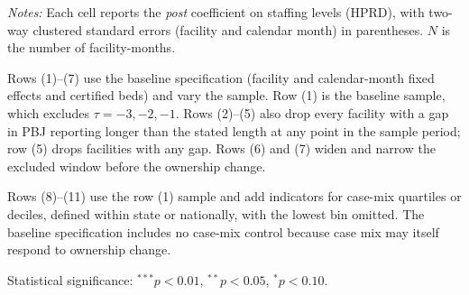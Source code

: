 \documentclass[11pt]{article}
\begin{document}
\begin{table}[!ht]
\begin{threeparttable}
\begin{tablenotes}[flushleft]
\footnotesize
\item \textit{Notes:} Each cell reports the \textit{post} coefficient on staffing levels (HPRD), with two-way clustered standard errors (facility and calendar month) in parentheses. $N$ is the number of facility-months.
\item Rows (1)--(7) use the baseline specification (facility and calendar-month fixed effects and certified beds) and vary the sample. Row (1) is the baseline sample, which excludes $\tau = -3, -2, -1$. Rows (2)--(5) also drop every facility with a gap in PBJ reporting longer than the stated length at any point in the sample period; row (5) drops facilities with any gap. Rows (6) and (7) widen and narrow the excluded window before the ownership change.
\item Rows (8)--(11) use the row (1) sample and add indicators for case-mix quartiles or deciles, defined within state or nationally, with the lowest bin omitted. The baseline specification includes no case-mix control because case mix may itself respond to ownership change.
\item Statistical significance: $^{***}p<0.01$, $^{**}p<0.05$, $^{*}p<0.10$.
\end{tablenotes}

\end{threeparttable}
\end{table}
\endgroup
\end{document}
